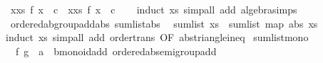 \begin{isabellebody}
\ \ {\isachardoublequoteopen}{\isacharparenleft}{\kern0pt}{\isasymSum}x{\isasymleftarrow}xs{\isachardot}{\kern0pt}\ f\ x\ {\isacharasterisk}{\kern0pt}\ c{\isacharparenright}{\kern0pt}\ {\isacharequal}{\kern0pt}\ {\isacharparenleft}{\kern0pt}{\isasymSum}x{\isasymleftarrow}xs{\isachardot}{\kern0pt}\ f\ x{\isacharparenright}{\kern0pt}\ {\isacharasterisk}{\kern0pt}\ c{\isachardoublequoteclose}\isanewline
%
\isadelimproof
\ \ %
\endisadelimproof
%
\isatagproof
{}\isamarkupfalse%
\ {\isacharparenleft}{\kern0pt}induct\ xs{\isacharparenright}{\kern0pt}\ {\isacharparenleft}{\kern0pt}simp{\isacharunderscore}{\kern0pt}all\ add{\isacharcolon}{\kern0pt}\ algebra{\isacharunderscore}{\kern0pt}simps{\isacharparenright}{\kern0pt}%
\endisatagproof
{\isafoldproof}%
%
\isadelimproof
\isanewline
%
\endisadelimproof
\isanewline
{}\isamarkupfalse%
\ {\isacharparenleft}{\kern0pt}\ ordered{\isacharunderscore}{\kern0pt}ab{\isacharunderscore}{\kern0pt}group{\isacharunderscore}{\kern0pt}add{\isacharunderscore}{\kern0pt}abs{\isacharparenright}{\kern0pt}\ sum{\isacharunderscore}{\kern0pt}list{\isacharunderscore}{\kern0pt}abs{\isacharcolon}{\kern0pt}\isanewline
\ \ {\isachardoublequoteopen}{\isasymbar}sum{\isacharunderscore}{\kern0pt}list\ xs{\isasymbar}\ {\isasymle}\ sum{\isacharunderscore}{\kern0pt}list\ {\isacharparenleft}{\kern0pt}map\ abs\ xs{\isacharparenright}{\kern0pt}{\isachardoublequoteclose}\isanewline
%
\isadelimproof
\ \ %
\endisadelimproof
%
\isatagproof
{}\isamarkupfalse%
\ {\isacharparenleft}{\kern0pt}induct\ xs{\isacharparenright}{\kern0pt}\ {\isacharparenleft}{\kern0pt}simp{\isacharunderscore}{\kern0pt}all\ add{\isacharcolon}{\kern0pt}\ order{\isacharunderscore}{\kern0pt}trans\ {\isacharbrackleft}{\kern0pt}OF\ abs{\isacharunderscore}{\kern0pt}triangle{\isacharunderscore}{\kern0pt}ineq{\isacharbrackright}{\kern0pt}{\isacharparenright}{\kern0pt}%
\endisatagproof
{\isafoldproof}%
%
\isadelimproof
\isanewline
%
\endisadelimproof
\isanewline
{}\isamarkupfalse%
\ sum{\isacharunderscore}{\kern0pt}list{\isacharunderscore}{\kern0pt}mono{\isacharcolon}{\kern0pt}\isanewline
\ \ \ f\ g\ {\isacharcolon}{\kern0pt}{\isacharcolon}{\kern0pt}\ {\isachardoublequoteopen}{\isacharprime}{\kern0pt}a\ {\isasymRightarrow}\ {\isacharprime}{\kern0pt}b{\isacharcolon}{\kern0pt}{\isacharcolon}{\kern0pt}{\isacharbraceleft}{\kern0pt}monoid{\isacharunderscore}{\kern0pt}add{\isacharcomma}{\kern0pt}\ ordered{\isacharunderscore}{\kern0pt}ab{\isacharunderscore}{\kern0pt}semigroup{\isacharunderscore}{\kern0pt}add{\isacharbraceright}{\kern0pt}{\isachardoublequoteclose}\isanewline

\end{isabellebody}
